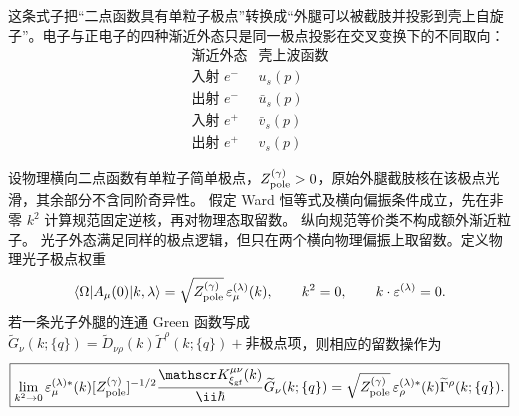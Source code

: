 这条式子把“二点函数具有单粒子极点”转换成“外腿可以被截肢并投影到壳上自旋子”。电子与正电子的四种渐近外态只是同一极点投影在交叉变换下的不同取向：
\begin{equation}
 \begin{array}{c|c}
 \text{渐近外态} & \text{壳上波函数}\\
 \hline
 \text{入射 }e^- & u_s(p)\\
 \text{出射 }e^- & \bar u_s(p)\\
 \text{入射 }e^+ & \bar v_s(p)\\
 \text{出射 }e^+ & v_s(p)
 \end{array}
 \label{eq:external-dirac-spinor-table-dp8}
\end{equation}

\begin{proposition}
设物理横向二点函数有单粒子简单极点，$Z_{\rm pole}^{(\gamma)}>0$，原始外腿截肢核在该极点光滑，其余部分不含同阶奇异性。
假定 Ward 恒等式及横向偏振条件成立，先在非零 $k^2$ 计算规范固定逆核，再对物理态取留数。
纵向规范等价类不构成额外渐近粒子。
光子外态满足同样的极点逻辑，但只在两个横向物理偏振上取留数。定义物理光子极点权重
\begin{equation}
 \langle\Omega|A_\mu(0)|k,\lambda\rangle
 =\sqrt{Z_{\rm pole}^{(\gamma)}}\,\varepsilon_\mu^{(\lambda)}(k),
 \qquad
 k^2=0,
 \qquad
 k\cdot\varepsilon^{(\lambda)}=0.
 \label{eq:photon-field-pole-overlap-r68}
\end{equation}
若一条光子外腿的连通 Green 函数写成 $\widetilde G_\nu(k;\{q\})=\widetilde D_{\nu\rho}(k)\widetilde\Gamma^\rho(k;\{q\})+\text{非极点项}$，则相应的留数操作为
\begin{equation}
 \boxed{
 \lim_{k^2\to0}
 \varepsilon_\mu^{(\lambda)*}(k)[Z_{\rm pole}^{(\gamma)}]^{-1/2}
 \frac{\mathscr K_{\xi_{\rm gf}}^{\mu\nu}(k)}{\ii\hbar}
 \widetilde G_\nu(k;\{q\})
 =\sqrt{Z_{\rm pole}^{(\gamma)}}\,\varepsilon_\rho^{(\lambda)*}(k)\widetilde\Gamma^\rho(k;\{q\}).}
 \label{eq:photon-lsz-amputation-r68}
\end{equation}
\end{proposition}
